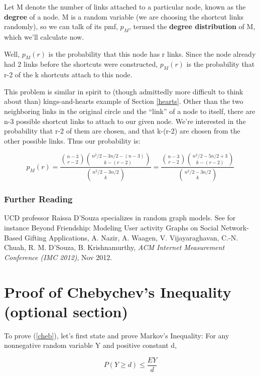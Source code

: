 Let M denote the number of links attached to a particular node, known
as the {\bf degree} of a node.  M is a random variable (we are choosing
the shortcut links randomly), so we can talk of its pmf, $p_M$, termed
the {\bf degree distribution} of M, which we'll calculate now.

Well, $p_M(r)$ is the probability that this node has r links.  Since the
node already had 2 links before the shortcuts were constructed, $p_M(r)$
is the probability that r-2 of the k shortcuts attach to this node.

This problem is similar in spirit to (though admittedly more difficult
to think about than) kings-and-hearts example of Section \ref{hearts}.
Other than the two neighboring links in the original circle and the
``link'' of a node to itself, there are n-3 possible shortcut links to
attach to our given node.  We're interested in the probability that r-2
of them are chosen, and that k-(r-2) are chosen from the other possible
links.  Thus our probability is:

\begin{equation}
p_M(r) =
\frac
{\binom{n-3}{r-2}
\binom{n^2/2-3n/2-(n-3)}{k-(r-2)}}
{\binom{n^2/2-3n/2}{k}} =
\frac
{\binom{n-3}{r-2}
\binom{n^2/2-5n/2+3}{k-(r-2)}}
{\binom{n^2/2-3n/2}{k}} 
\end{equation}

\subsubsection{Further Reading}

UCD professor Raissa D'Souza specializes in random graph models.  See
for instance Beyond Friendship: Modeling User activity Graphs on Social
Network-Based Gifting Applications, A. Nazir, A. Waagen, V.
Vijayaraghavan, C.-N. Chuah, R. M.  D'Souza, B. Krishnamurthy, {\it ACM
Internet Measurement Conference (IMC 2012)}, Nov 2012. 

\section{Proof of Chebychev's Inequality (optional section)}
\label{chebproof}

To prove (\ref{cheb}), let's first state and prove Markov's Inequality:
For any nonnegative random variable Y and positive constant d,

\begin{equation}
\label{mi}
P(Y \geq d) \leq \frac{EY}{d}
\end{equation}

